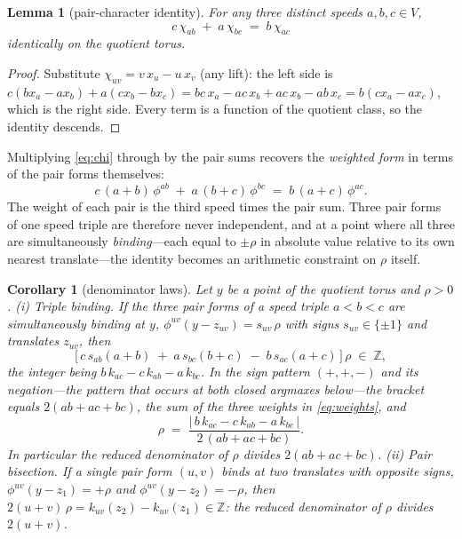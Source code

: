 \documentclass[11pt,a4paper]{article}
\numberwithin{equation}{section}
\theoremstyle{plain}
\newtheorem{lemma}[theorem]{Lemma}
\newtheorem{corollary}[theorem]{Corollary}
\theoremstyle{definition}
\theoremstyle{remark}
\newcommand{\Z}{\mathbb{Z}}
\begin{document}
\begin{lemma}[pair-character identity]\label{lem:chi}
For any three distinct speeds $a,b,c\in V$,
\begin{equation}\label{eq:chi}
c\,\chi_{ab}\;+\;a\,\chi_{bc}\;=\;b\,\chi_{ac}
\end{equation}
identically on the quotient torus.
\end{lemma}

\begin{proof}
Substitute $\chi_{uv}=v\,x_u-u\,x_v$ (any lift): the left side is
$c(bx_a-ax_b)+a(cx_b-bx_c)=bc\,x_a-ac\,x_b+ac\,x_b-ab\,x_c
=b(cx_a-ax_c)$, which is the right side. Every term is a function of
the quotient class, so the identity descends.
\end{proof}

Multiplying \eqref{eq:chi} through by the pair sums recovers the
\emph{weighted form} in terms of the pair forms themselves:
\begin{equation}\label{eq:weights}
c\,(a{+}b)\,\phi^{ab}\;+\;a\,(b{+}c)\,\phi^{bc}\;=\;
b\,(a{+}c)\,\phi^{ac}.
\end{equation}
The weight of each pair is the third speed times the pair sum. Three
pair forms of one speed triple are therefore never independent, and at a
point where all three are simultaneously \emph{binding}---each equal to
$\pm\rho$ in absolute value relative to its own nearest translate---the
identity becomes an arithmetic constraint on $\rho$ itself.

\begin{corollary}[denominator laws]\label{cor:denom}
Let $y$ be a point of the quotient torus and $\rho>0$.
\emph{(i) Triple binding.} If the three pair forms of a speed triple
$a<b<c$ are simultaneously binding at $y$,
$\phi^{uv}(y-z_{uv})=s_{uv}\,\rho$ with signs $s_{uv}\in\{\pm1\}$ and
translates $z_{uv}$, then
\[
\bigl[\,c\,s_{ab}(a{+}b)\;+\;a\,s_{bc}(b{+}c)\;-\;b\,s_{ac}(a{+}c)\,
\bigr]\,\rho\;\in\;\Z,
\]
the integer being $b\,k_{ac}-c\,k_{ab}-a\,k_{bc}$. In the sign pattern
$(+,+,-)$ and its negation---the pattern that occurs at both closed
argmaxes below---the bracket equals $2(ab{+}ac{+}bc)$, the sum of the
three weights in \eqref{eq:weights}, and
\[
\rho\;=\;\frac{\bigl|\,b\,k_{ac}-c\,k_{ab}-a\,k_{bc}\,\bigr|}
{2\,(ab+ac+bc)}.
\]
In particular the reduced denominator of $\rho$ divides
$2(ab+ac+bc)$.
\emph{(ii) Pair bisection.} If a single pair form $(u,v)$ binds at two
translates with opposite signs, $\phi^{uv}(y-z_1)=+\rho$ and
$\phi^{uv}(y-z_2)=-\rho$, then $2(u{+}v)\,\rho=k_{uv}(z_2)-k_{uv}(z_1)
\in\Z$: the reduced denominator of $\rho$ divides $2(u+v)$.
\end{corollary}
\end{document}
